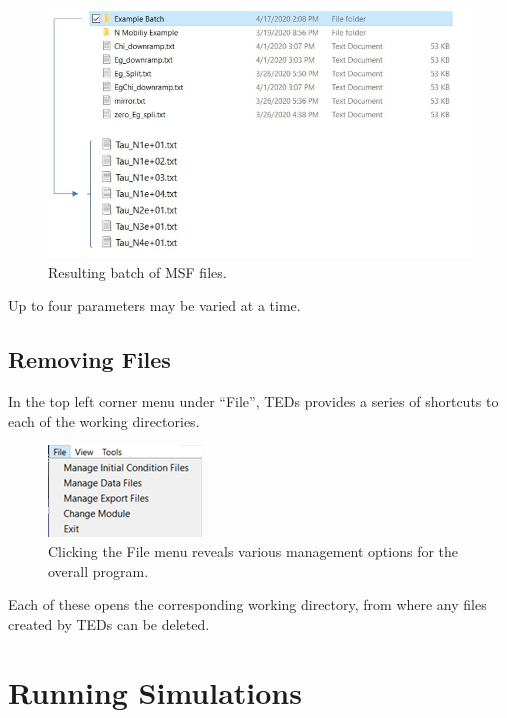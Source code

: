 \documentclass[11pt,letterpaper,titlepage]{article}
\begin{document}
		\begin{figure}[H]
			\label{fig:batch_example_dir}
			\centering
			\includegraphics[scale=0.9]{"batch_example_dir"}
			\caption{Resulting batch of MSF files.}
		\end{figure}
	
		\par Up to four parameters may be varied at a time.
		
		\subsection{Removing Files}
		
		\par In the top left corner menu under “File”, TEDs provides a series of shortcuts to each of the working directories.
		
		\begin{figure}[H]
			\label{fig:file_menu}
			\centering
			\includegraphics[scale=1]{"file_menu"}
			\caption{Clicking the File menu reveals various management options for the overall program.}
		\end{figure}
	
		\par Each of these opens the corresponding working directory, from where any files created by TEDs can be deleted.
		
	\newpage
	\section{Running Simulations}
	
\end{document}

